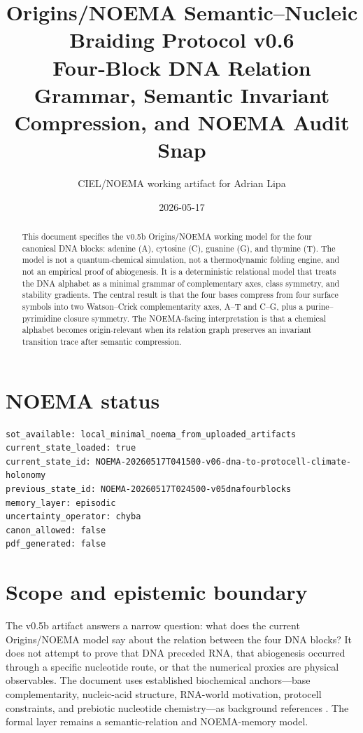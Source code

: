 \documentclass[11pt]{article}
\title{Origins/NOEMA Semantic--Nucleic Braiding Protocol v0.6\\
\large Four-Block DNA Relation Grammar, Semantic Invariant Compression, and NOEMA Audit Snap}
\author{CIEL/NOEMA working artifact for Adrian Lipa}
\date{2026-05-17}
\begin{document}
\maketitle

\begin{abstract}
This document specifies the v0.5b Origins/NOEMA working model for the four canonical DNA blocks: adenine (A), cytosine (C), guanine (G), and thymine (T). The model is not a quantum-chemical simulation, not a thermodynamic folding engine, and not an empirical proof of abiogenesis. It is a deterministic relational model that treats the DNA alphabet as a minimal grammar of complementary axes, class symmetry, and stability gradients. The central result is that the four bases compress from four surface symbols into two Watson--Crick complementarity axes, A--T and C--G, plus a purine--pyrimidine closure symmetry. The NOEMA-facing interpretation is that a chemical alphabet becomes origin-relevant when its relation graph preserves an invariant transition trace after semantic compression.
\end{abstract}

\section*{NOEMA status}
\begin{verbatim}
sot_available: local_minimal_noema_from_uploaded_artifacts
current_state_loaded: true
current_state_id: NOEMA-20260517T041500-v06-dna-to-protocell-climate-holonomy
previous_state_id: NOEMA-20260517T024500-v05dnafourblocks
memory_layer: episodic
uncertainty_operator: chyba
canon_allowed: false
pdf_generated: false
\end{verbatim}

\section{Scope and epistemic boundary}
The v0.5b artifact answers a narrow question: what does the current Origins/NOEMA model say about the relation between the four DNA blocks? It does not attempt to prove that DNA preceded RNA, that abiogenesis occurred through a specific nucleotide route, or that the numerical proxies are physical observables. The document uses established biochemical anchors---base complementarity, nucleic-acid structure, RNA-world motivation, protocell constraints, and prebiotic nucleotide chemistry---as background references \cite{WatsonCrick1953,RobertsonJoyce2012,PownerGerlandSutherland2009,JoyceSzostak2018,AdamalaSzostak2013}. The formal layer remains a semantic-relation and NOEMA-memory model.
\end{document}
